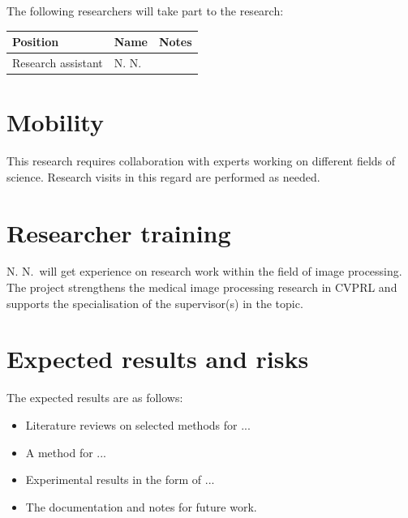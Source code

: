 \documentclass[11pt,a4,notitlepage]{article}
\newcommand{\researcher}{N. N.}
\begin{document}
The following researchers will take part to the research:

\begin{center} \begin{tabular}{lll}
%
Position & Name & Notes \\
%
\hline
%
Research assistant & \researcher & \\
%
%
%
\hline
%
%
%
\end{tabular} \end{center}

\section{Mobility}

This research requires collaboration with experts working on different fields
of science. Research visits in this regard are performed as needed.

\section{Researcher training}

\researcher\ will get experience on research work within the field of image
processing. The project strengthens the medical image processing research in
\ac{CVPRL} and supports the specialisation of the supervisor(s) in the topic.

\section{Expected results and risks}

The expected results are as follows:
%
\begin{itemize}
%
\item Literature reviews on selected methods for ...
%
\item A method for ...
%
\item Experimental results in the form of ...
%
\item The documentation and notes for future work.
%
\end{itemize}
\end{document}

